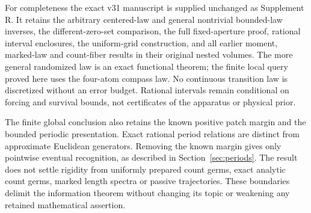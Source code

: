 For completeness the exact v31 manuscript is supplied unchanged as
Supplement R. It retains the arbitrary centered-law and general
nontrivial bounded-law inverses, the different-zero-set comparison,
the full fixed-aperture proof, rational interval enclosures, the
uniform-grid construction, and all earlier moment, marked-law and
count-fiber results in their original nested volumes. The more general
randomized law is an exact functional theorem; the finite local query
proved here uses the four-atom compass law. No continuous transition
law is discretized without an error budget. Rational intervals remain
conditional on forcing and survival bounds, not certificates of the
apparatus or physical prior.

The finite global conclusion also retains the known positive patch
margin and the bounded periodic presentation. Exact rational period
relations are distinct from approximate Euclidean generators. Removing
the known margin gives only pointwise eventual recognition, as described
in Section~\ref{sec:periods}. The result does not settle rigidity from
uniformly prepared count germs, exact analytic count germs, marked
length spectra or passive trajectories. These boundaries delimit the
information theorem without changing its topic or weakening any retained
mathematical assertion.
